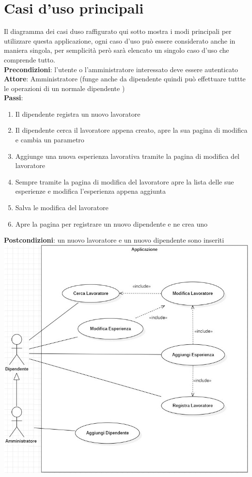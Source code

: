 \documentclass[ 4paper,11pt,openany]{book}
\begin{document}
\section{Casi d'uso principali}
Il diagramma dei casi duso raffigurato qui sotto mostra i modi principali per utilizzare questa applicazione, ogni caso d'uso può essere considerato anche in maniera singola, per semplicità però sarà elencato un singolo caso d'uso che comprende tutto.\\
\textbf{Precondizioni}: l'utente o l'amministratore interessato deve essere autenticato\\
\textbf{Attore}: Amministratore (funge anche da dipendente quindi può effettuare tuttte le operazioni di un normale dipendente )\\
\textbf{Passi}:
\begin{enumerate}
\item Il dipendente registra un nuovo lavoratore
\item Il dipendente cerca il lavoratore appena creato, apre la sua pagina di modifica e cambia un parametro 
\item Aggiunge una nuova esperienza lavorativa tramite la pagina di modifica del lavoratore
\item Sempre tramite la pagina di modifica del lavoratore apre la lista delle sue esperienze e modifica l'esperienza appena aggiunta
\item Salva le modifica del lavoratore
\item Apre la pagina per registrare un nuovo dipendente e ne crea uno
\end{enumerate}
\textbf{Postcondizioni}: un nuovo lavoratore e un nuovo dipendente sono inseriti\\

\includegraphics[width=180mm]{casi.jpg}
\end{document}
